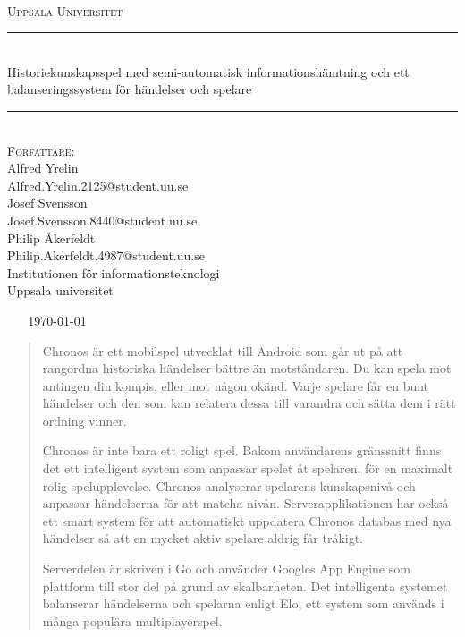 \documentclass[a4paper, 11pt]{article}
\begin{document}
\begin{titlepage}
\newcommand{\HRule}{\rule{\linewidth}{0.5mm}}
\begin{center}

\textsc{\Large }\\[2.5cm]
\textsc{\LARGE Uppsala Universitet}\\[1.5cm] 

\HRule \\[0.3cm]
{ \huge \textup {Historiekunskapsspel med semi-automatisk informationshämtning och ett balanseringssystem för händelser och spelare}}\\[0.3cm]
\HRule \\[1.5cm]

\Large \textsc{Författare:}\\[0.5cm]
\large \textup{Alfred Yrelin}\\
\large \textup{Alfred.Yrelin.2125@student.uu.se}\\ [0.2cm]
\large \textup{Josef Svensson}\\
\large \textup{Josef.Svensson.8440@student.uu.se}\\[0.2cm]
\large \textup{Philip Åkerfeldt}\\
\large \textup{Philip.Akerfeldt.4987@student.uu.se}\\[0.5cm]

\large \textup{\textup{Institutionen för informationsteknologi}}\\
\large \textup{\textup{Uppsala universitet}}\\[0.6cm]
\end{center}
~ \hfill
\center
~
{\Large \today}\\[2cm]
\vfill

\end{titlepage}

\newpage

\begin{abstract}
Chronos är ett mobilspel utvecklat till Android som går ut på att rangordna historiska händelser bättre än motståndaren. Du kan spela mot antingen din kompis, eller mot någon okänd.
Varje spelare får en bunt händelser och den som kan relatera dessa till varandra och sätta dem i rätt ordning vinner. 

Chronos är inte bara ett roligt spel. Bakom användarens gränssnitt finns det ett intelligent system som anpassar spelet åt spelaren, för en maximalt rolig spelupplevelse. Chronos analyserar spelarens kunskapsnivå och anpassar händelserna för att matcha nivån. Serverapplikationen har också ett smart system för att automatiskt uppdatera Chronos databas med nya händelser så att en mycket aktiv spelare aldrig får tråkigt.

Serverdelen är skriven i Go och använder Googles App Engine som plattform till stor del på grund av skalbarheten. Det intelligenta systemet balanserar händelserna och spelarna enligt Elo, ett system som används i många populära multiplayerspel.
\end{abstract}
\end{document}
